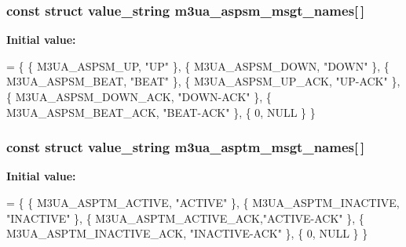 \subsubsection[{m3ua\+\_\+aspsm\+\_\+msgt\+\_\+names}]{\setlength{\rightskip}{0pt plus 5cm}const struct value\+\_\+string m3ua\+\_\+aspsm\+\_\+msgt\+\_\+names[$\,$]\hspace{0.3cm}{\ttfamily [static]}}\label{m3ua_8c_aedeeb45ea953715b07a481c37a1fe60b}
{\bfseries Initial value\+:}
\begin{DoxyCode}
= \{
        \{ M3UA_ASPSM_UP,        \textcolor{stringliteral}{"UP"} \},
        \{ M3UA_ASPSM_DOWN,      \textcolor{stringliteral}{"DOWN"} \},
        \{ M3UA_ASPSM_BEAT,      \textcolor{stringliteral}{"BEAT"} \},
        \{ M3UA_ASPSM_UP_ACK,    \textcolor{stringliteral}{"UP-ACK"} \},
        \{ M3UA_ASPSM_DOWN_ACK,  \textcolor{stringliteral}{"DOWN-ACK"} \},
        \{ M3UA_ASPSM_BEAT_ACK,  \textcolor{stringliteral}{"BEAT-ACK"} \},
        \{ 0, NULL \}
\}
\end{DoxyCode}
\subsubsection[{m3ua\+\_\+asptm\+\_\+msgt\+\_\+names}]{\setlength{\rightskip}{0pt plus 5cm}const struct value\+\_\+string m3ua\+\_\+asptm\+\_\+msgt\+\_\+names[$\,$]}\label{m3ua_8c_a2325c85c80cd3a09f2bdf493f344ea84}
{\bfseries Initial value\+:}
\begin{DoxyCode}
= \{
        \{ M3UA_ASPTM_ACTIVE,    \textcolor{stringliteral}{"ACTIVE"} \},
        \{ M3UA_ASPTM_INACTIVE,  \textcolor{stringliteral}{"INACTIVE"} \},
        \{ M3UA_ASPTM_ACTIVE_ACK,\textcolor{stringliteral}{"ACTIVE-ACK"} \},
        \{ M3UA_ASPTM_INACTIVE_ACK, \textcolor{stringliteral}{"INACTIVE-ACK"} \},
        \{ 0, NULL \}
\}
\end{DoxyCode}
